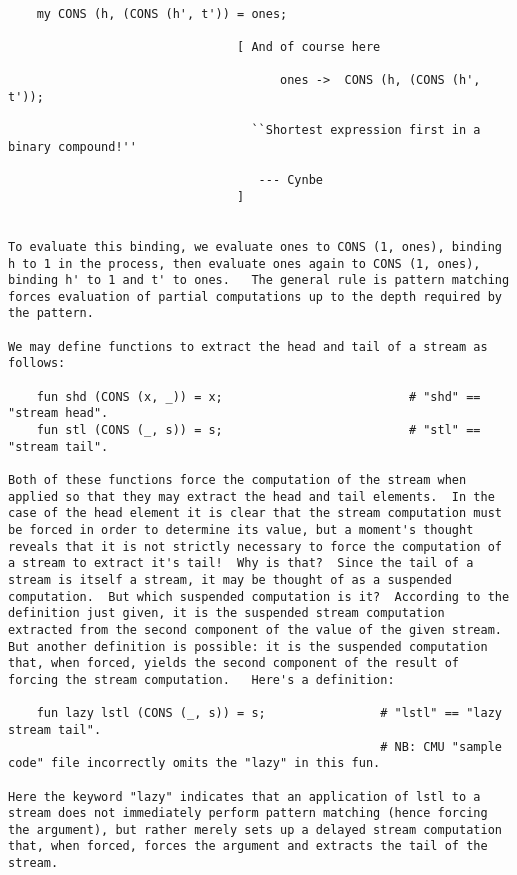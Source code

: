 \begin{verbatim}
 
    my CONS (h, (CONS (h', t')) = ones; 
 
                                [ And of course here 
 
                                      ones ->  CONS (h, (CONS (h', t')); 
 
                                  ``Shortest expression first in a binary compound!'' 
 
                                   --- Cynbe 
                                ] 
 
 
To evaluate this binding, we evaluate ones to CONS (1, ones), binding 
h to 1 in the process, then evaluate ones again to CONS (1, ones), 
binding h' to 1 and t' to ones.   The general rule is pattern matching 
forces evaluation of partial computations up to the depth required by 
the pattern. 
 
We may define functions to extract the head and tail of a stream as 
follows: 
 
    fun shd (CONS (x, _)) = x;                          # "shd" == "stream head". 
    fun stl (CONS (_, s)) = s;                          # "stl" == "stream tail". 
 
Both of these functions force the computation of the stream when 
applied so that they may extract the head and tail elements.  In the 
case of the head element it is clear that the stream computation must 
be forced in order to determine its value, but a moment's thought 
reveals that it is not strictly necessary to force the computation of 
a stream to extract it's tail!  Why is that?  Since the tail of a 
stream is itself a stream, it may be thought of as a suspended 
computation.  But which suspended computation is it?  According to the 
definition just given, it is the suspended stream computation 
extracted from the second component of the value of the given stream. 
But another definition is possible: it is the suspended computation 
that, when forced, yields the second component of the result of 
forcing the stream computation.   Here's a definition: 
 
    fun lazy lstl (CONS (_, s)) = s;                # "lstl" == "lazy stream tail". 
                                                    # NB: CMU "sample code" file incorrectly omits the "lazy" in this fun.  
  
Here the keyword "lazy" indicates that an application of lstl to a 
stream does not immediately perform pattern matching (hence forcing 
the argument), but rather merely sets up a delayed stream computation 
that, when forced, forces the argument and extracts the tail of the 
stream. 
 

\end{verbatim}
